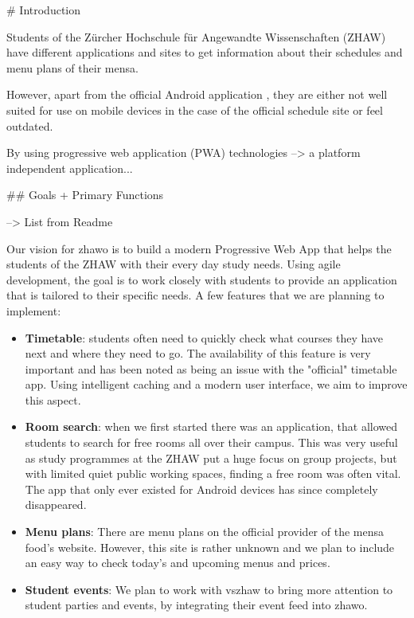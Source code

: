 \begin{markdown}

# Introduction

Students of the Zürcher Hochschule für Angewandte Wissenschaften (ZHAW) have different applications and sites to get
information about their schedules and menu plans of their mensa.

However, apart from the official Android application \cite{DUMMY},
they are either not well suited for use on mobile devices in the case of the official schedule site \cite{DUMMY} or feel
outdated.

By using progressive web application (PWA) technologies \cite{DUMMY} --> a platform independent application...

## Goals + Primary Functions

--> List from Readme

Our vision for zhawo is to build a modern Progressive Web App that helps the students of the ZHAW with their every day study needs. Using agile development, the goal is to work closely with students to provide an application that is tailored to their specific needs.
A few features that we are planning to implement:
\begin{itemize}
  \item \textbf{Timetable}: students often need to quickly check what courses they have next and where they need to go. The availability of this feature is very important and has been noted as being an issue with the "official" timetable app. Using intelligent caching and a modern user interface, we aim to improve this aspect.
  \item \textbf{Room search}: when we first started there was an application, that allowed students to search for free rooms all over their campus. This was very useful as study programmes at the ZHAW put a huge focus on group projects, but with limited quiet public working spaces, finding a free room was often vital. The app that only ever existed for Android devices has since completely disappeared.
  \item \textbf{Menu plans}: There are menu plans on the official provider of the mensa food's website. However, this site is rather unknown and we plan to include an easy way to check today's and upcoming menus and prices.
  \item \textbf{Student events}: We plan to work with vszhaw to bring more attention to student parties and events, by integrating their event feed into zhawo.
\end{itemize}

\end{markdown}
